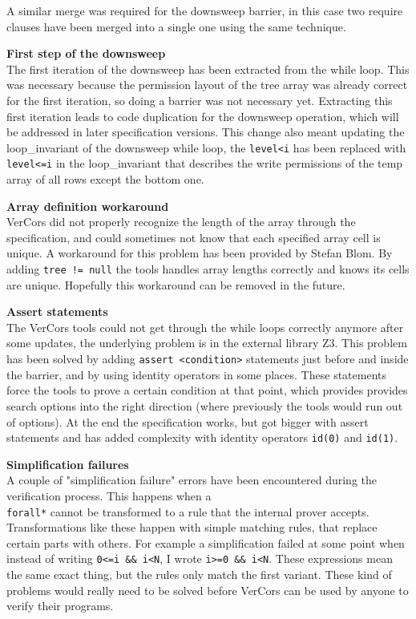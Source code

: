 \documentclass[a4paper]{article}
\newcommand{\code}[1]{\texttt{\small \color{inline}#1}} %
\begin{document}
A similar merge was required for the downsweep barrier, in this case two require clauses have been merged into a single one using the same technique.

\textbf{First step of the downsweep}\\
The first iteration of the downsweep has been extracted from the while loop. This was necessary because the permission layout of the tree array was already correct for the first iteration, so doing a barrier was not necessary yet. Extracting this first iteration leads to code duplication for the downsweep operation, which will be addressed in later specification versions. This change also meant updating the loop\_invariant of the downsweep while loop, the \code{level<i} has been replaced with \code{level<=i} in the loop\_invariant that describes the write permissions of the temp array of all rows except the bottom one.

\textbf{Array definition workaround}\\
VerCors did not properly recognize the length of the array through the specification, and could sometimes not know that each specified array cell is unique. A workaround for this problem has been provided by Stefan Blom. By adding \code{tree != null} the tools handles array lengths correctly and knows its cells are unique. Hopefully this workaround can be removed in the future.

\textbf{Assert statements}\\
The VerCors tools could not get through the while loops correctly anymore after some updates, the underlying problem is in the external library Z3. This problem has been solved by adding \code{assert <condition>} statements just before and inside the barrier, and by using identity operators in some places. These statements force the tools to prove a certain condition at that point, which provides provides search options into the right direction (where previously the tools would run out of options). At the end the specification works, but got bigger with assert statements and has added complexity with identity operators \code{id(0)} and \code{id(1)}.

\textbf{Simplification failures}\\
A couple of "simplification failure" errors have been encountered during the verification process. This happens when a \code{\\forall*} cannot be transformed to a rule that the internal prover accepts. Transformations like these happen with simple matching rules, that replace certain parts with others. For example a simplification failed at some point when instead of writing \code{0<=i \&\& i<N}, I wrote \code{i>=0 \&\& i<N}. These expressions mean the same exact thing, but the rules only match the first variant. These kind of problems would really need to be solved before VerCors can be used by anyone to verify their programs.
\end{document}
